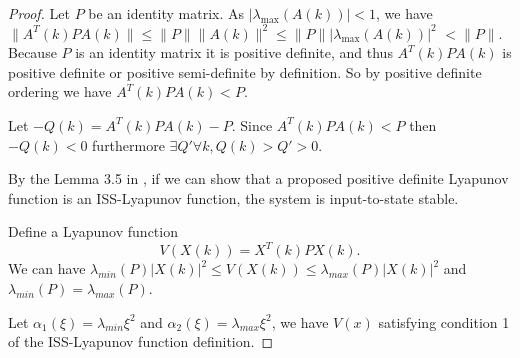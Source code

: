 \documentclass{sig-alternate}
\begin{document}
\begin{proof} 
Let $ P $ be an identity matrix.
As $ | \lambda_{\max} ( A(k) ) | < 1 $, we have
$
\lVert A^{T}(k) P A(k) \rVert \leq \lVert P \rVert \lVert A(k) \rVert^{2} \leq \lVert P \rVert | \lambda_{\max} ( A(k) ) |^{2} $ $  <  \lVert P \rVert .
$
Because $ P $ is an identity matrix it is positive definite, and thus $ A^{T}(k) P A(k) $ is positive definite or positive semi-definite by definition.
So by positive definite ordering we have $ A^{T}(k) P A(k) < P $.
		
Let $ -Q(k) = A^{T}(k) P A(k) - P $. Since $ A^{T}(k) P A(k) < P $ then $ - Q(k) < 0 $ furthermore $ \exists Q' \forall k, Q(k) > Q' > 0 $. 
		
By the Lemma 3.5 in \cite{Jiang2001857}, if we can show that a proposed positive definite Lyapunov function is an ISS-Lyapunov function, the system is input-to-state stable.
		
Define a Lyapunov function
\begin{equation}
\label{eq:lyapunov_v}
V( X(k) ) = X^{T} (k) P X(k).
\end{equation}
We can have
$
\lambda_{min}(P) | X(k) |^{2} \leq V( X(k) )\leq \lambda_{max}(P) | X(k) |^{2}
$ and $ \lambda_{min}(P) = \lambda_{max}(P) $.
		
Let $ \alpha_{1} ( \xi )= \lambda_{min} \xi^{2} $
and 
$ \alpha_{2} ( \xi )= \lambda_{max} \xi^{2} $,
we have $ V(x) $ satisfying condition 1 of the ISS-Lyapunov function definition.
		

\end{proof}
\end{document}
